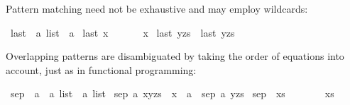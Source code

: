 \begin{isabellebody}
\begin{isamarkuptext}
Pattern matching
need not be exhaustive and may employ wildcards:%
\end{isamarkuptext}%
\isamarkuptrue%
\isamarkupfalse%
\ last\ {}{}\ {}{}a\ list\ {}\ {}a{}\ \isanewline
{}last\ {}x{}\ \ \ \ \ \ {}\ x{}\ {}\isanewline
{}last\ {}{}{}y{}zs{}\ {}\ last\ {}y{}zs{}{}%
\begin{isamarkuptext}%
Overlapping patterns are disambiguated by taking the order of equations into
account, just as in functional programming:%
\end{isamarkuptext}%
\isamarkuptrue%
\isamarkupfalse%
\ sep{}\ {}{}\ {}{}a\ {}\ {}a\ list\ {}\ {}a\ list{}\ \isanewline
{}sep{}\ a\ {}x{}y{}zs{}\ {}\ x\ {}\ a\ {}\ sep{}\ a\ {}y{}zs{}{}\ {}\isanewline
{}sep{}\ {}\ xs\ \ \ \ \ \ \ {}\ xs{}%

\end{isabellebody}
